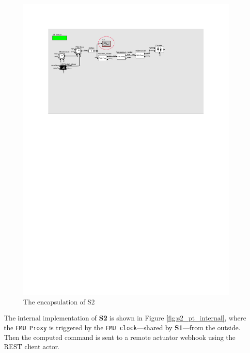\begin{figure}[hbt!]
  \centering
  \includegraphics[scale=1.1]{figures/s2_pt_composite.pdf}
  \caption{The encapsulation of S2}
  \label{fig:s2_pt_composite}
\end{figure}

The internal implementation of \textbf{S2} is shown in Figure \ref{fig:s2_pt_internal}, where the \texttt{FMU Proxy} is triggered by the \texttt{FMU clock}---shared by \textbf{S1}---from the outside. Then the computed command is sent to a remote actuator webhook using the REST client actor.

